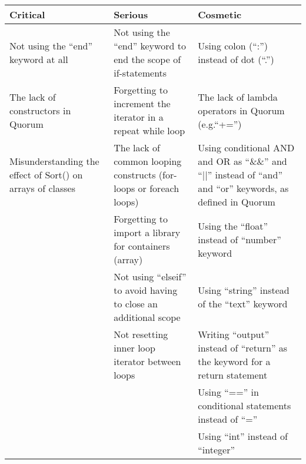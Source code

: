 \begin{table}[]
\centering
\renewcommand{\arraystretch}{1.5}
\label{QuorumProblemResult}
\begin{tabular}{| p{5cm} | p{5cm} | p{5cm} |}
\hline
\textbf{Critical}                                          & \textbf{Serious}                                                   & \textbf{Cosmetic}                                                                                        \\ \hline
Not using the “end” keyword at all                         & Not using the “end” keyword to end the scope of if-statements      & Using colon (“:”) instead of dot (“.”)                                                                   \\ \hline
The lack of constructors in Quorum                         & Forgetting to increment the iterator in a repeat while loop        & The lack of lambda operators in Quorum (e.g.“+=”)                                                        \\ \hline
Misunderstanding the effect of Sort() on arrays of classes & The lack of common looping constructs (for-loops or foreach loops) & Using conditional AND and OR as “\&\&” and “||” instead of “and” and “or” keywords, as defined in Quorum \\ \hline
                                                           & Forgetting to import a library for containers (array)              & Using the “float” instead of “number” keyword                                                            \\ \hline
                                                           & Not using “elseif” to avoid having to close an additional scope    & Using “string” instead of the “text” keyword                                                             \\ \hline
                                                           & Not resetting inner loop iterator between loops                    & Writing “output” instead of “return” as the keyword for a return statement                               \\ \hline
                                                           &                                                                    & Using “==” in conditional statements instead of “=”                                                      \\ \hline
                                                           &                                                                    & Using “int” instead of “integer”                                                                         \\ \hline

\end{tabular}
\end{table}
